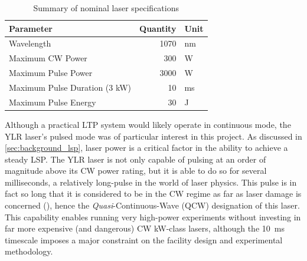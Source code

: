             \begin{table}[h]
                \centering
                \caption{Summary of nominal laser specifications}
                \label{tab:laser_spec}
                \begin{tabular}{@{}lrl@{}}
                    \toprule
                    Parameter            & Quantity & Unit \\ \midrule
                    Wavelength                    & 1070              & nm            \\
                    Maximum CW Power              & 300               & W             \\
                    Maximum Pulse Power           & 3000              & W             \\
                    Maximum Pulse Duration (3 kW) & 10                & ms            \\
                    Maximum Pulse Energy          & 30              & J             \\ \bottomrule
                    \end{tabular}
            \end{table}

            Although a practical LTP system would likely operate in continuous mode, the YLR laser's pulsed mode was of particular interest in this project. As discussed in \autoref{sec:background_lsp}, laser power is a critical factor in the ability to achieve a steady LSP. The YLR laser is not only capable of pulsing at an order of magnitude above its CW power rating, but it is able to do so for several milliseconds, a relatively long-pulse in the world of laser physics. This pulse is in fact so long that it is considered to be in the CW regime as far as laser damage is concerned (\textcite{thorlabsNBK7PlanoConvexLenses}), hence the \emph{Quasi}-Continuous-Wave (QCW) designation of this laser. This capability enables running very high-power experiments without investing in far more expensive (and dangerous) CW kW-class lasers, although the 10~ms timescale imposes a major constraint on the facility design and experimental methodology.
        

